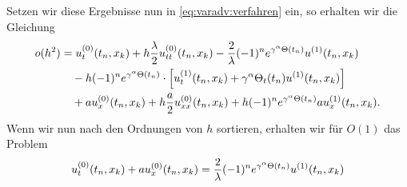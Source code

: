Setzen wir diese Ergebnisse nun in \eqref{eq:varadv:verfahren} ein, so erhalten wir die Gleichung
\begin{align}
\begin{split}
o(h^2) &= 
u^{(0)}_t(t_n, x_k) + h \frac \lambda 2 u^{(0)}_{tt}(t_n, x_k) - \frac 2 \lambda (-1)^n e^{\gamma^\alpha \Theta(t_n)} u^{(1)}(t_n, x_k)\\
&\quad - h (-1)^n e^{\gamma^\alpha \Theta(t_n)} \cdot \left[ u^{(1)}_t(t_n, x_k) + \gamma^\alpha \Theta_t(t_n) u^{(1)}(t_n, x_k) \right]\\
&\quad + a u^{(0)}_x(t_n, x_k) + h \frac {a}2 u^{(0)}_{xx}(t_n, x_k) + h (-1)^n e^{\gamma^\alpha \Theta(t_n)} a u^{(1)}_x(t_n, x_k).
\end{split}
\end{align}
Wenn wir nun nach den Ordnungen von $h$ sortieren, erhalten wir für $O(1)$ das Problem
\begin{align}
u^{(0)}_t(t_n, x_k) + a u^{(0)}_x(t_n, x_k) = \frac 2 \lambda (-1)^n e^{\gamma^\alpha \Theta(t_n)} u^{(1)}(t_n, x_k)
\end{align}